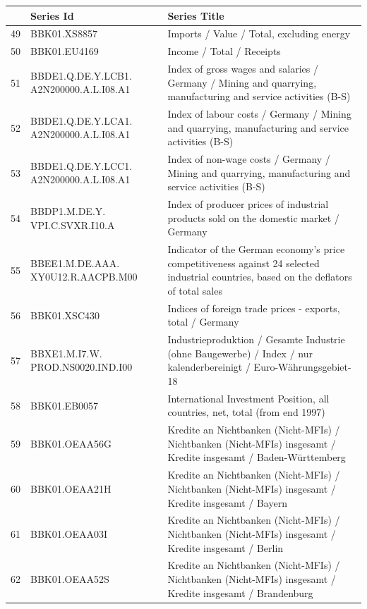 \documentclass[12pt]{article}
\begin{document}
\begin{table}
\centering
\begin{tabular}{rp{5cm}p{11cm}}
& \textbf{Series Id} & \textbf{Series Title} \\
  \hline
  \hline
  49 & BBK01.XS8857 & Imports / Value / Total, excluding energy \\ 
  \hline
  50 & BBK01.EU4169 & Income / Total / Receipts \\ 
  \hline
  51 & BBDE1.Q.DE.Y.LCB1. A2N200000.A.L.I08.A1 & Index of gross wages and salaries / Germany / Mining and quarrying, manufacturing and service activities (B-S) \\ 
  \hline
  52 & BBDE1.Q.DE.Y.LCA1. A2N200000.A.L.I08.A1 & Index of labour costs / Germany / Mining and quarrying, manufacturing and service activities (B-S) \\ 
  \hline
  53 & BBDE1.Q.DE.Y.LCC1. A2N200000.A.L.I08.A1 & Index of non-wage costs / Germany / Mining and quarrying, manufacturing and service activities (B-S) \\ 
  \hline
  54 & BBDP1.M.DE.Y. VPI.C.SVXR.I10.A & Index of producer prices of industrial products sold on the domestic market / Germany \\ 
  \hline
  55 & BBEE1.M.DE.AAA. XY0U12.R.AACPB.M00 & Indicator of the German economy's price competitiveness against 24 selected industrial countries, based on the deflators of total sales \\ 
  \hline
  56 & BBK01.XSC430 & Indices of foreign trade prices - exports, total / Germany \\ 
  \hline
  57 & BBXE1.M.I7.W. PROD.NS0020.IND.I00 & Industrieproduktion / Gesamte Industrie (ohne Baugewerbe) / Index / nur kalenderbereinigt / Euro-Währungsgebiet-18 \\ 
  \hline
  58 & BBK01.EB0057 & International Investment Position, all countries, net, total (from end 1997) \\ 
  \hline
  59 & BBK01.OEAA56G & Kredite an Nichtbanken (Nicht-MFIs) / Nichtbanken (Nicht-MFIs) insgesamt / Kredite insgesamt / Baden-Württemberg \\ 
  \hline
  60 & BBK01.OEAA21H & Kredite an Nichtbanken (Nicht-MFIs) / Nichtbanken (Nicht-MFIs) insgesamt / Kredite insgesamt / Bayern \\ 
  \hline
  61 & BBK01.OEAA03I & Kredite an Nichtbanken (Nicht-MFIs) / Nichtbanken (Nicht-MFIs) insgesamt / Kredite insgesamt / Berlin \\ 
  \hline
  62 & BBK01.OEAA52S & Kredite an Nichtbanken (Nicht-MFIs) / Nichtbanken (Nicht-MFIs) insgesamt / Kredite insgesamt / Brandenburg \\ 

\end{tabular}
\end{table}
\end{document}

